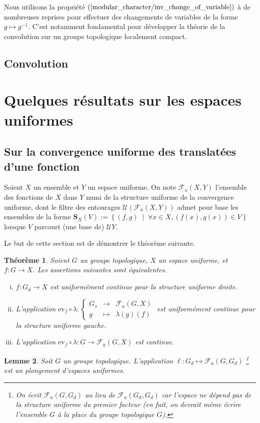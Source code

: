 \documentclass[a4paper,12pt]{article}
\newtheorem{theorem}{Théorème}[section]
\newtheorem{lemma}[theorem]{Lemme}
\newcommand{\ev}{\mathrm{ev}}
\newcommand{\set}[1]{\left\{ #1 \right\}}
\newcommand\fundef[3]{#1: \left\{\begin{array}{ccc}#2\\#3\end{array}\right.}
\newcommand{\tq}{\;\middle|\;}
\newcommand{\inv}{^{-1}}
\newcommand{\comp}{\circ}
\begin{document}
Nous utilisons la propriété $(\ref{modular_character/inv_change_of_variable})$ à de nombreuses reprises
pour effectuer des changements de variables de la forme $g\mapsto g\inv$. C'est notamment fondamental pour développer 
la théorie de la convolution sur un groupe topologique localement compact.

\subsection*{Convolution}

\section{Quelques résultats sur les espaces uniformes}
\subsection*{Sur la convergence uniforme des translatées d'une fonction}

Soient $X$ un ensemble et $Y$ un espace uniforme. On note $\mathcal{F}_u(X, Y)$ l'ensemble des 
fonctions de $X$ dans $Y$ muni de la structure uniforme de la convergence uniforme, dont le filtre des entourages 
$\mathcal{U}(\mathcal{F}_u(X, Y))$ admet pour base les ensembles de la forme 
$\mathbf{S}_X(V) := \set{(f, g)\tq\forall x\in X, (f(x),g(x))\in V}$ lorsque $V$ parcourt (une base de) $\mathcal{U}Y$.

Le but de cette section est de démontrer le théorème suivante.
\begin{theorem}\label{uniform_continuous_iff_postcomp}
    Soient $G$ un groupe topologique, $X$ un espace uniforme, et $f:G\to X$. Les assertions suivantes sont équivalentes.
    \begin{enumerate}[(i)]
        \item $f:G_d\to X$ est uniformément continue \emph{pour la structure uniforme droite}.
        \item L'application $\fundef{\ev_f\comp\lambda}{G_s&\to&\mathcal{F}_u(G,X)}{g&\mapsto&\lambda(g)(f)}$ est uniformément continue
            \emph{pour la structure uniforme gauche}.
        \item L'application $\ev_f\comp\lambda:G\to\mathcal{F}_u(G,X)$ est continue.
    \end{enumerate}
\end{theorem}

\begin{lemma}
    Soit $G$ un groupe topologique. L'application $\ell : G_d\mapsto\mathcal{F}_u(G, G_d)$
    \footnote{On écrit $\mathcal{F}_u(G, G_d)$ au lieu de $\mathcal{F}_u(G_d, G_d)$ car l'espace
    ne dépend pas de la structure uniforme du premier facteur (en fait, on devrait même écrire l'ensemble $G$ 
    à la place du groupe topologique $G$).} est un plongement d'espaces uniformes.
\end{lemma}
\end{document}
